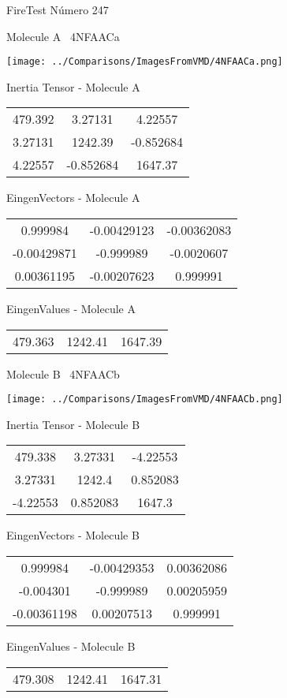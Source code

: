 \vtab[-3cm]
\begin{center}
{\large FireTest \tab Número 247}
\end{center}
\begin{multicols}{2}
\begin{center}

Molecule A \
4NFAACa

\texttt{[image: ../Comparisons/ImagesFromVMD/4NFAACa.png]}

Inertia Tensor - Molecule A \\
\begin{tabular}{|c c c|}
479.392	 & 	3.27131	 & 	4.22557	 \\
3.27131	 & 	1242.39	 & 	-0.852684	 \\
4.22557	 & 	-0.852684	 & 	1647.37
\end{tabular}

\vtab
 EingenVectors - Molecule A     \\
\begin{tabular}{|c c c|}
0.999984	 & 	-0.00429123	 & 	-0.00362083	 \\
-0.00429871	 & 	-0.999989	 & 	-0.0020607	 \\
0.00361195	 & 	-0.00207623	 & 	0.999991
\end{tabular}

\vtab
 EingenValues - Molecule A     \\
\begin{tabular}{|c c c|}
479.363	 & 	1242.41	 & 	1647.39	 \\
\end{tabular}
\columnbreak

Molecule B \
4NFAACb

\texttt{[image: ../Comparisons/ImagesFromVMD/4NFAACb.png]}

Inertia Tensor - Molecule B \\
\begin{tabular}{|c c c|}
479.338	 & 	3.27331	 & 	-4.22553	 \\
3.27331	 & 	1242.4	 & 	0.852083	 \\
-4.22553	 & 	0.852083	 & 	1647.3
\end{tabular}

\vtab
 EingenVectors - Molecule B     \\
\begin{tabular}{|c c c|}
0.999984	 & 	-0.00429353	 & 	0.00362086	 \\
-0.004301	 & 	-0.999989	 & 	0.00205959	 \\
-0.00361198	 & 	0.00207513	 & 	0.999991
\end{tabular}

\vtab
 EingenValues - Molecule B     \\
\begin{tabular}{|c c c|}
479.308	 & 	1242.41	 & 	1647.31	 \\
\end{tabular}

\end{center}
\end{multicols}

